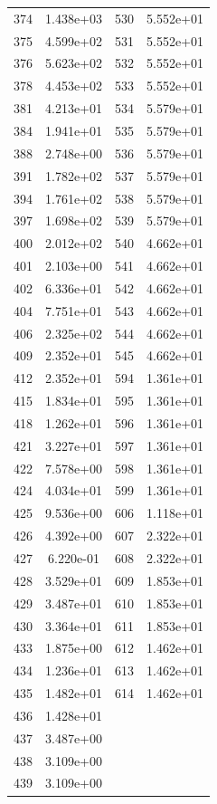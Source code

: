 \documentclass[12pt]{article}
\begin{document}
\begin{longtable}{@{}cccc@{}}
374 & 1.438e+03 & 530 & 5.552e+01 \\
375 & 4.599e+02 & 531 & 5.552e+01 \\
376 & 5.623e+02 & 532 & 5.552e+01 \\
378 & 4.453e+02 & 533 & 5.552e+01 \\
381 & 4.213e+01 & 534 & 5.579e+01 \\
384 & 1.941e+01 & 535 & 5.579e+01 \\
388 & 2.748e+00 & 536 & 5.579e+01 \\
391 & 1.782e+02 & 537 & 5.579e+01 \\
394 & 1.761e+02 & 538 & 5.579e+01 \\
397 & 1.698e+02 & 539 & 5.579e+01 \\
400 & 2.012e+02 & 540 & 4.662e+01 \\
401 & 2.103e+00 & 541 & 4.662e+01 \\
402 & 6.336e+01 & 542 & 4.662e+01 \\
404 & 7.751e+01 & 543 & 4.662e+01 \\
406 & 2.325e+02 & 544 & 4.662e+01 \\
409 & 2.352e+01 & 545 & 4.662e+01 \\
412 & 2.352e+01 & 594 & 1.361e+01 \\
415 & 1.834e+01 & 595 & 1.361e+01 \\
418 & 1.262e+01 & 596 & 1.361e+01 \\
421 & 3.227e+01 & 597 & 1.361e+01 \\
422 & 7.578e+00 & 598 & 1.361e+01 \\
424 & 4.034e+01 & 599 & 1.361e+01 \\
425 & 9.536e+00 & 606 & 1.118e+01 \\
426 & 4.392e+00 & 607 & 2.322e+01 \\
427 & 6.220e-01 & 608 & 2.322e+01 \\
428 & 3.529e+01 & 609 & 1.853e+01 \\
429 & 3.487e+01 & 610 & 1.853e+01 \\
430 & 3.364e+01 & 611 & 1.853e+01 \\
433 & 1.875e+00 & 612 & 1.462e+01 \\
434 & 1.236e+01 & 613 & 1.462e+01 \\
435 & 1.482e+01 & 614 & 1.462e+01 \\
436 & 1.428e+01 &  &  \\
437 & 3.487e+00 &  &  \\
438 & 3.109e+00 &  &  \\
439 & 3.109e+00 &  &  \\

\end{longtable}
\end{document}
